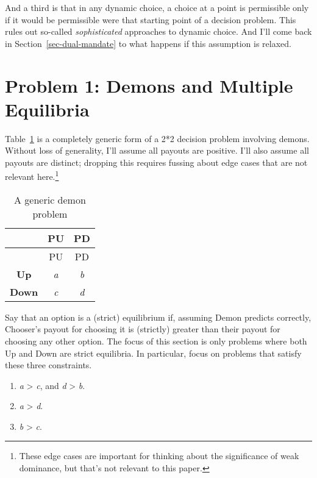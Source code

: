 \documentclass[
  11pt,
  letterpaper,
  DIV=11,
  numbers=noendperiod,
  twoside]{scrartcl}
\providecommand{\tightlist}{%
  \setlength{\itemsep}{0pt}\setlength{\parskip}{0pt}}\usepackage{longtable,booktabs,array}
\begin{document}
And a third is that in any dynamic choice, a choice at a point is
permissible only if it would be permissible were that starting point of
a decision problem. This rules out so-called \emph{sophisticated}
approaches to dynamic choice. And I'll come back in
Section~\ref{sec-dual-mandate} to what happens if this assumption is
relaxed.

\section{Problem 1: Demons and Multiple Equilibria}\label{sec-multiple}

Table~\ref{tbl-generic-demon} is a completely generic form of a 2*2
decision problem involving demons. Without loss of generality, I'll
assume all payouts are positive. I'll also assume all payouts are
distinct; dropping this requires fussing about edge cases that are not
relevant here.\footnote{These edge cases are important for thinking
  about the significance of weak dominance, but that's not relevant to
  this paper.}

\begin{longtable}[]{@{}ccc@{}}
\caption{A generic demon
problem}\label{tbl-generic-demon}\tabularnewline
\toprule\noalign{}
& PU & PD \\
\midrule\noalign{}
\endfirsthead
\toprule\noalign{}
& PU & PD \\
\midrule\noalign{}
\endhead
\bottomrule\noalign{}
\endlastfoot
\textbf{Up} & \emph{a} & \emph{b} \\
\textbf{Down} & \emph{c} & \emph{d} \\
\end{longtable}

Say that an option is a (strict) equilibrium if, assuming Demon predicts
correctly, Chooser's payout for choosing it is (strictly) greater than
their payout for choosing any other option. The focus of this section is
only problems where both Up and Down are strict equilibria. In
particular, focus on problems that satisfy these three constraints.

\begin{enumerate}
\def\labelenumi{\arabic{enumi}.}
\tightlist
\item
  \emph{a} \textgreater{} \emph{c}, and \emph{d} \textgreater{}
  \emph{b}.
\item
  \emph{a} \textgreater{} \emph{d}.
\item
  \emph{b} \textgreater{} \emph{c}.
\end{enumerate}
\end{document}
